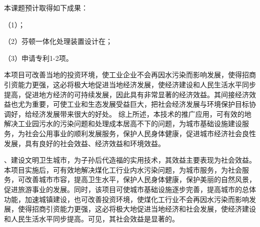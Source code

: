 {}\par
本课题预计取得如下成果：\par
（1）；\par
（2）芬顿一体化处理装置设计在；\par
（3）申请专利1-2项。\par
{}\par
本项目可改善当地的投资环境，使工业企业不会再因水污染而影响发展，使得招商引资能力更强，这必将极大地促进当地经济发展，使经济建设和人民生活水平同步提高，促进地方经济的可持续发展，因此具有非常显著的经济效益。其间接经济效益也尤为重要，可使工业和生态发展受益巨大，把社会经济发展与环境保护目标协调好，给经济发展带来很大的好处。
综上所述，本技术的推广应用，可有效的地解决工业园污水的污染问题和处理成本居高不下的问题，为城市基础设施建设服务，为社会公用事业的顺利发展服务，保护人民身体健康，促进城市经济社会良性发展，具有良好的社会效益、经济效益和环境效益。\par
{}\par
{}、建设文明卫生城市，为子孙后代造福的实用技术，其效益主要表现为社会效益。本项目实施后，可有效地解决煤化工行业内水污染问题，为城市服务，为社会服务，可改善城市市容，提高卫生水平，保护人民身体健康，保护美丽的自然风景，促进旅游事业的发展。同时，该项目可使城市基础设施逐步完善，提高城市的总体功能，加速城镇建设，也可改善投资环境，使煤化工行业不会再因水污染而影响发展，使得招商引资能力更强，这必将极大地促进当地经济和社会发展，使经济建设和人民生活水平同步提高。可见，其社会效益是显著的。
